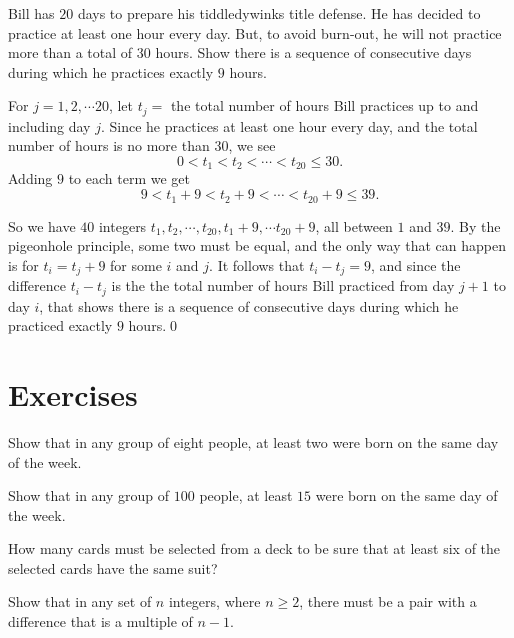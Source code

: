 \begin{exmp}
 Bill has $20$ days to prepare his tiddledywinks title defense. 
 He has decided to practice at least one hour every day.  But, to avoid burn-out,
 he  will not practice more than a total of $30$ hours. Show there is a  sequence
 of consecutive days during which he practices exactly $9$ hours. 
\end{exmp}
\begin{soln}
 For $j = 1,2,\cdots 20$, let $t_j = $ the total number of hours
 Bill practices up to and including day $j$.
 Since he practices at least one hour every day, and the total number of hours 
 is no more than $30$, we see
 \[
 0<t_1<t_2<\cdots<t_{20}\leq 30.
 \]
 Adding $9$ to each term we get
 \[
 9<t_1+9<t_2+9<\cdots<t_{20}+9\leq 39.
 \]
 
 So we have $40$ integers $t_1,t_2,\cdots, t_{20}, t_1+9,\cdots t_{20}+9$,
 all between $1$ and $39$. By the pigeonhole principle, some two must be
 equal, and the only way that can happen is for $t_i= t_j+9$ for some 
 $i$ and $j$. It follows that $t_i-t_j = 9$, and since the difference
 $t_i-t_j$ is the the total number of hours Bill practiced
 from day $j+1$ to day $i$, that shows there is a sequence of consecutive
 days during which he practiced exactly $9$ hours.\;\qed
\end{soln}

\clearpage
\section{Exercises}

\begin{exer}
Show that in any group of eight people, at least two were born on the 
same day of the week.
\end{exer}

\begin{exer}
Show that in any group of $100$ people, at least $15$ were born on the
same day of the week.
\end{exer}

\begin{exer}
How many cards must be selected from a deck to be sure that at least
six of the selected cards have the same suit?
\end{exer}

\begin{exer}
Show that in any set of $n$ integers, where $n\geq2$, there must be a pair
with a difference that is a multiple of $n-1$.
\end{exer}

